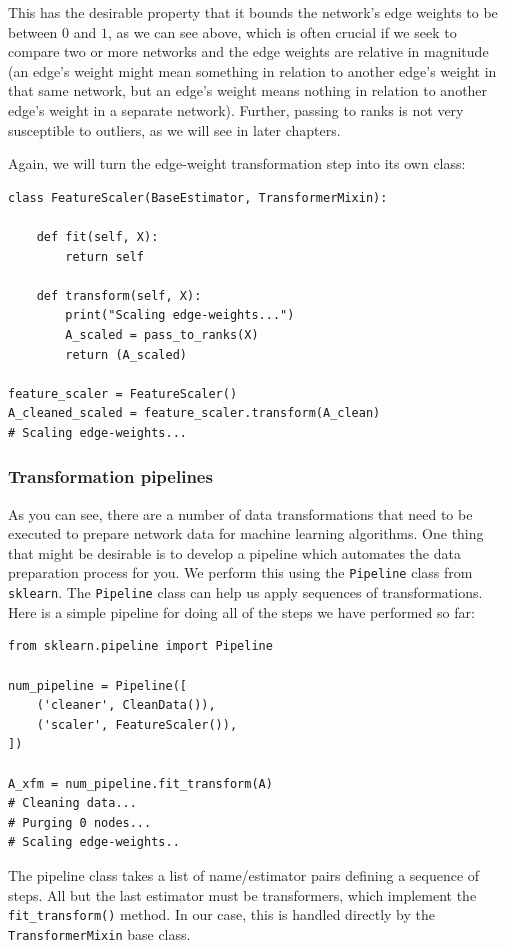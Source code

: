 This has the desirable property that it bounds the network's edge weights to be between $0$ and $1$, as we can see above, which is often crucial if we seek to compare two or more networks and the edge weights are relative in magnitude (an edge's weight might mean something in relation to another edge's weight in that same network, but an edge's weight means nothing in relation to another edge's weight in a separate network). Further, passing to ranks is not very susceptible to outliers, as we will see in later chapters. 

Again, we will turn the edge-weight transformation step into its own class:

\begin{lstlisting}[style=python]
class FeatureScaler(BaseEstimator, TransformerMixin):
    
    def fit(self, X):
        return self
    
    def transform(self, X):
        print("Scaling edge-weights...")
        A_scaled = pass_to_ranks(X)
        return (A_scaled)
    
feature_scaler = FeatureScaler()
A_cleaned_scaled = feature_scaler.transform(A_clean)
# Scaling edge-weights...
\end{lstlisting}

\subsubsection*{Transformation pipelines}

As you can see, there are a number of data transformations that need to be executed to prepare network data for machine learning algorithms. One thing that might be desirable is to develop a pipeline which automates the data preparation process for you. We perform this using the \texttt{Pipeline} class from \texttt{sklearn}. The \texttt{Pipeline} class can help us apply sequences of transformations. Here is a simple pipeline for doing all of the steps we have performed so far:
\begin{lstlisting}[style=python]
from sklearn.pipeline import Pipeline

num_pipeline = Pipeline([
    ('cleaner', CleanData()),
    ('scaler', FeatureScaler()),
])

A_xfm = num_pipeline.fit_transform(A)
# Cleaning data...
# Purging 0 nodes...
# Scaling edge-weights..
\end{lstlisting}

The pipeline class takes a list of name/estimator pairs defining a sequence of steps. All but the last estimator must be transformers, which implement the \texttt{fit\_transform()} method. In our case, this is handled directly by the \texttt{TransformerMixin} base class.

